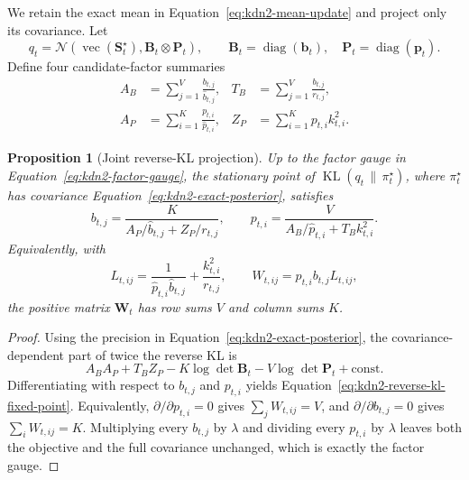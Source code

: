 \documentclass[11pt]{article}
\newcommand{\ve}[1]{\boldsymbol{#1}}
\newcommand{\diag}{\operatorname{diag}}
\newcommand{\KL}{\operatorname{KL}}
\newcommand{\Normal}{\mathcal{N}}
\newtheorem{proposition}{Proposition}
\begin{document}
We retain the exact mean in Equation~\eqref{eq:kdn2-mean-update} and project only its covariance.
Let
\begin{equation}
  q_t
  =\Normal\!\left(
    \operatorname{vec}(\ve{S}_t^{\star}),
    \ve{B}_t\otimes\ve{P}_t
  \right),
  \qquad
  \ve{B}_t=\diag(\ve{b}_t),
  \quad
  \ve{P}_t=\diag(\ve{p}_t).
  \label{eq:kdn2-variational-family}
\end{equation}
Define four candidate-factor summaries
\begin{equation}
\begin{aligned}
  A_B&=\sum_{j=1}^{V}\frac{b_{t,j}}{\widehat b_{t,j}},
  &
  T_B&=\sum_{j=1}^{V}\frac{b_{t,j}}{r_{t,j}},
  \\
  A_P&=\sum_{i=1}^{K}\frac{p_{t,i}}{\widehat p_{t,i}},
  &
  Z_P&=\sum_{i=1}^{K}p_{t,i}k_{t,i}^2.
\end{aligned}
  \label{eq:kdn2-projection-summaries}
\end{equation}

\begin{proposition}[Joint reverse-KL projection]
Up to the factor gauge in Equation~\eqref{eq:kdn2-factor-gauge}, the stationary point of
$\KL(q_t\,\|\,\pi_t^{\star})$, where $\pi_t^{\star}$ has covariance
Equation~\eqref{eq:kdn2-exact-posterior}, satisfies
\begin{equation}
  b_{t,j}
  =\frac{K}{A_P/\widehat b_{t,j}+Z_P/r_{t,j}},
  \qquad
  p_{t,i}
  =\frac{V}{A_B/\widehat p_{t,i}+T_B k_{t,i}^2}.
  \label{eq:kdn2-reverse-kl-fixed-point}
\end{equation}
Equivalently, with
\begin{equation}
  L_{t,ij}
  =\frac{1}{\widehat p_{t,i}\widehat b_{t,j}}
   +\frac{k_{t,i}^2}{r_{t,j}},
  \qquad
  W_{t,ij}=p_{t,i}b_{t,j}L_{t,ij},
  \label{eq:kdn2-balancing-matrix}
\end{equation}
the positive matrix $\ve{W}_t$ has row sums $V$ and column sums $K$.
\end{proposition}

\begin{proof}
Using the precision in Equation~\eqref{eq:kdn2-exact-posterior}, the covariance-dependent part of
twice the reverse KL is
\begin{equation}
  A_BA_P+T_BZ_P-K\log\det\ve{B}_t-V\log\det\ve{P}_t
  +\mathrm{const}.
  \label{eq:kdn2-reverse-kl-objective}
\end{equation}
Differentiating with respect to $b_{t,j}$ and $p_{t,i}$ yields
Equation~\eqref{eq:kdn2-reverse-kl-fixed-point}.  Equivalently,
$\partial/\partial p_{t,i}=0$ gives
$\sum_jW_{t,ij}=V$, and $\partial/\partial b_{t,j}=0$ gives
$\sum_iW_{t,ij}=K$.  Multiplying every $b_{t,j}$ by $\lambda$ and dividing every $p_{t,i}$ by
$\lambda$ leaves both the objective and the full covariance unchanged, which is exactly the
factor gauge.
\end{proof}
\end{document}

